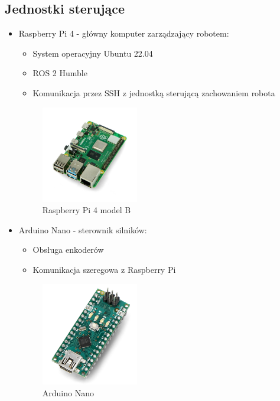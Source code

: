 \documentclass[a4paper,twoside,12pt]{book}
\begin{document}
\subsection{Jednostki sterujące}
\begin{itemize}
\item Raspberry Pi 4 - główny komputer zarządzający robotem:
	\begin{itemize}
	\item System operacyjny Ubuntu 22.04
	\item ROS 2 Humble
	\item Komunikacja przez SSH z jednostką sterującą zachowaniem robota
	\end{itemize}
	\begin{figure}[h]
		\centering
		\includegraphics[width=0.4\textwidth]{images/rasp.png}
		\caption{Raspberry Pi 4 model B}
		\label{fig:raspberrypi4}
		\end{figure}
		\newpage	
		
\item Arduino Nano - sterownik silników:
	\begin{itemize}
	\item Obsługa enkoderów
	\item Komunikacja szeregowa z Raspberry Pi
	\end{itemize}

	\begin{figure}
		\centering
		\includegraphics[width=0.4\textwidth]{images/nano.png}
		\caption{Arduino Nano}
		\label{fig:ardunano}
		\end{figure}
\end{itemize}
\end{document}

